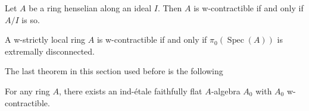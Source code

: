 \begin{lemma}
    \label{lem:w-contractible-henselian}

    Let $A$ be a ring henselian along an ideal $I$. Then $A$ is w-contractible if and only if $A/I$ is so.
\end{lemma}

\begin{lemma}
    \label{lem:w-strictly-local-pi0-extremally-disconnected}
    A w-strictly local ring $A$ is w-contractible if and only if $\pi_0(\operatorname{Spec}(A))$ is extremally disconnected.
\end{lemma}

The last theorem in this section used before \cite[Theorem 5.6.2]{proetale} is the following 

\begin{lemma}
    For any ring $A$, there exists an ind-étale faithfully flat $A$-algebra $A_0$ with $A_0$ w-contractible.
    \label{thm:ind-etale-w-contractible-cover-exists}
\end{lemma}


